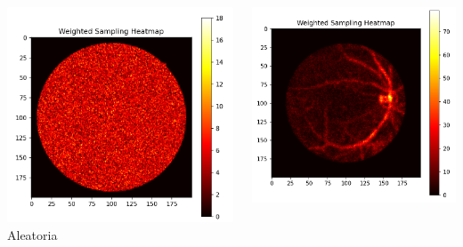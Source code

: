 \documentclass[xcolor=dvipsnames]{beamer}
\begin{document}
\begin{frame}
    \begin{columns}[T]
        \begin{column}{0.3\textwidth}
            \centering
            \includegraphics[width=\textwidth]{../imaxes/muestraje/random_sampling_heatmap.png}
            \small{Aleatoria}
        \end{column}
        \begin{column}{0.3\textwidth}
            \centering
            \includegraphics[width=\textwidth]{../imaxes/muestraje/weighted_sampling_heatmap.png}

\end{column}
\end{columns}
\end{frame}
\end{document}
